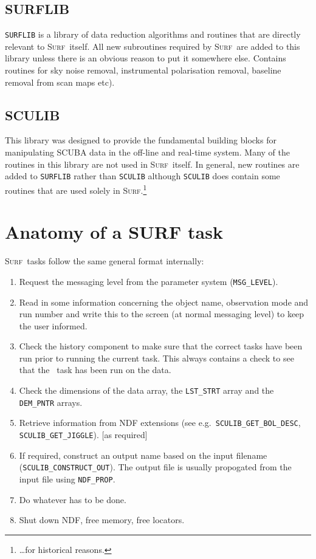 \documentclass[twoside,11pt,nolof]{starlink}
\providecommand{\task}[1]{\textsf{#1}}
\providecommand{\param}[1]{\texttt{#1}}
\providecommand{\resw}{\xref{\task{reduce\_switch}}{sun216}{REDUCE_SWITCH}}
\providecommand{\scusoft}          {\textsc{Surf}}
\begin{document}
\subsection{SURFLIB}

\texttt{SURFLIB} is a library of data reduction algorithms and routines that
are directly relevant to \scusoft\ itself. All new subroutines required by
\scusoft\ are added to this library unless there is an obvious reason to put
it somewhere else. Contains routines for sky noise removal, instrumental
polarisation removal, baseline removal from scan maps etc).


\subsection{SCULIB}

This library was designed to provide the fundamental building blocks for
manipulating SCUBA data in the off-line and real-time system. Many of the
routines in this library are not used in \scusoft\ itself. In general,
new routines are added to \texttt{SURFLIB} rather than \texttt{SCULIB}
although \texttt{SCULIB} does contain some routines that are used solely in
\scusoft.\footnote{\ldots for historical reasons.}


\section{Anatomy of a SURF task}

\scusoft\ tasks follow the same general format internally:

\begin{enumerate}
\item Request the messaging level from the parameter system
(\param{MSG\_LEVEL}).
\item Read in some information concerning the object name, observation mode
and run number and write this to the screen (at normal messaging level) to
keep the user informed.
\item Check the history component to make sure that the correct tasks have
been run prior to running the current task. This always contains a check to
see that the \resw\ task has been run on the data.
\item Check the dimensions of the data array, the \texttt{LST\_STRT} array and
the \texttt{DEM\_PNTR} arrays.
\item Retrieve information from NDF extensions (see e.g.\
\texttt{SCULIB\_GET\_BOL\_DESC}, \texttt{SCULIB\_GET\_JIGGLE}). [as required]
\item If required, construct an output name based on the input filename
(\texttt{SCULIB\_CONSTRUCT\_OUT}). The output file is usually propogated from
the input file using \texttt{NDF\_PROP}.
\item Do whatever has to be done.
\item Shut down NDF, free memory, free locators.

\end{enumerate}
\end{document}
